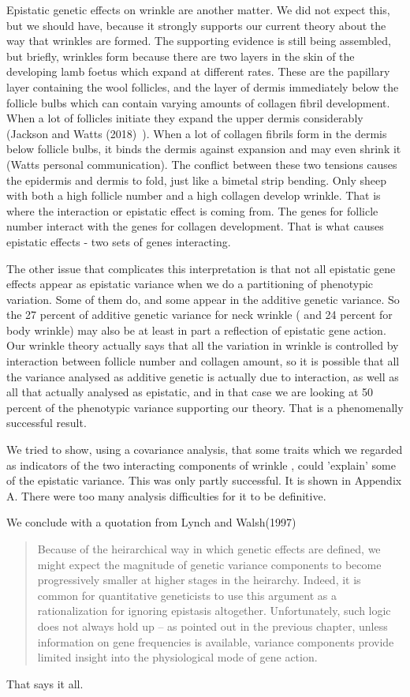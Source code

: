 \documentclass[titlepage]{article}  %
\begin{document}
Epistatic genetic effects on wrinkle are another matter. We did not expect this, but we should have, because it strongly supports our current theory about the way that wrinkles are formed.  The supporting evidence is still being assembled, but briefly, wrinkles form because there are two layers in the skin of the developing lamb foetus which expand at different rates. These are the papillary layer containing the wool follicles, and the layer of dermis immediately below the follicle bulbs which can contain varying amounts of collagen fibril development. When a lot of follicles initiate they expand the upper dermis considerably (Jackson and Watts (2018)~\cite{jack:18}). When a lot of collagen fibrils form in the dermis below follicle bulbs, it binds the dermis against expansion and may even shrink it (Watts personal communication). The conflict between these two tensions causes the epidermis and dermis to fold, just like a bimetal strip bending. Only sheep with both a high follicle number and a high collagen develop wrinkle. That is where the interaction or epistatic effect is coming from. The genes for follicle number interact with the genes for collagen development.  That is what causes epistatic effects - two sets of genes interacting.

The other issue that complicates this interpretation is that not all epistatic gene effects appear as epistatic variance when we do a partitioning of phenotypic variation. Some of them do, and some appear in the additive genetic variance. So the 27 percent of additive genetic variance for neck wrinkle ( and 24 percent for body wrinkle) may also be  at least in part a reflection of epistatic gene action. Our wrinkle theory actually says that all the variation in wrinkle is controlled by interaction between follicle number and collagen amount, so it is possible that all the variance analysed as additive genetic is actually due to interaction, as well as all that actually analysed as epistatic, and in that case we are looking at 50 percent of the phenotypic variance supporting our theory. That is a phenomenally successful result. 

We tried to show, using a covariance analysis, that some traits which we regarded as indicators of the two interacting components of wrinkle , could 'explain' some of the epistatic variance. This was only partly successful. It is shown in Appendix A. There were too many analysis difficulties for it to be definitive.

We conclude with a quotation from Lynch and Walsh(1997)~\cite{lync:97}
\begin{quote}
 Because of the heirarchical way in which genetic effects are defined, we might expect the magnitude of genetic variance components to become progressively smaller at higher stages in the heirarchy. Indeed, it is common for quantitative geneticists to use this argument as a rationalization for ignoring epistasis altogether. Unfortunately, such logic does not always hold up -- as pointed out in the previous chapter, unless information on gene frequencies is available, variance components provide limited insight into the physiological mode of gene action.
\end{quote}
That says it all.
\end{document}
